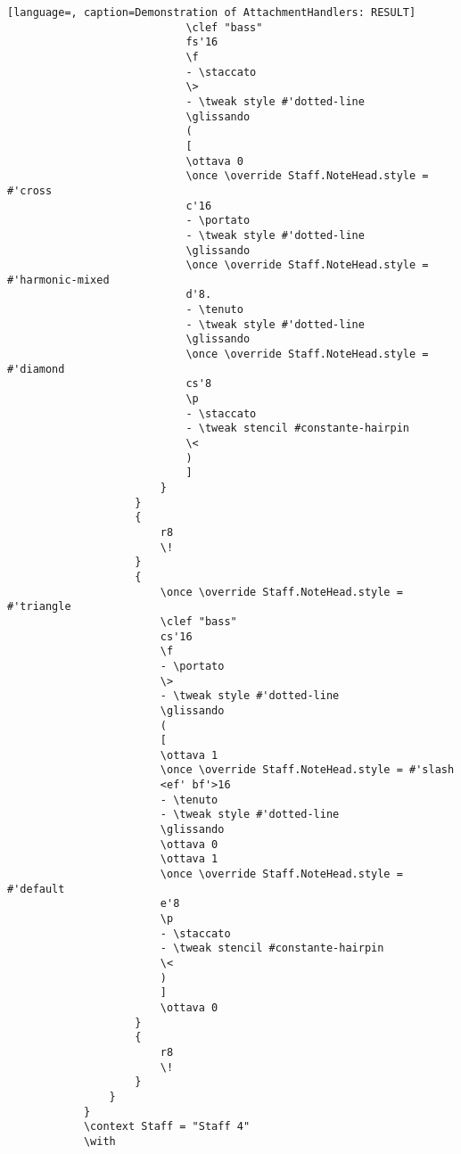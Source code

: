 \begin{lstlisting}[language=, caption=Demonstration of AttachmentHandlers: RESULT]
                            \clef "bass"
                            fs'16
                            \f
                            - \staccato
                            \>
                            - \tweak style #'dotted-line
                            \glissando
                            (
                            [
                            \ottava 0
                            \once \override Staff.NoteHead.style = #'cross
                            c'16
                            - \portato
                            - \tweak style #'dotted-line
                            \glissando
                            \once \override Staff.NoteHead.style = #'harmonic-mixed
                            d'8.
                            - \tenuto
                            - \tweak style #'dotted-line
                            \glissando
                            \once \override Staff.NoteHead.style = #'diamond
                            cs'8
                            \p
                            - \staccato
                            - \tweak stencil #constante-hairpin
                            \<
                            )
                            ]
                        }
                    }
                    {
                        r8
                        \!
                    }
                    {
                        \once \override Staff.NoteHead.style = #'triangle
                        \clef "bass"
                        cs'16
                        \f
                        - \portato
                        \>
                        - \tweak style #'dotted-line
                        \glissando
                        (
                        [
                        \ottava 1
                        \once \override Staff.NoteHead.style = #'slash
                        <ef' bf'>16
                        - \tenuto
                        - \tweak style #'dotted-line
                        \glissando
                        \ottava 0
                        \ottava 1
                        \once \override Staff.NoteHead.style = #'default
                        e'8
                        \p
                        - \staccato
                        - \tweak stencil #constante-hairpin
                        \<
                        )
                        ]
                        \ottava 0
                    }
                    {
                        r8
                        \!
                    }
                }
            }
            \context Staff = "Staff 4"
            \with

\end{lstlisting}

